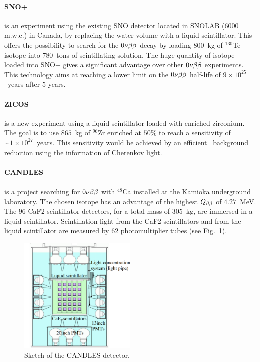 \paragraph{SNO+} is an experiment using the existing SNO detector located in SNOLAB ($6000$ m.w.e.) in Canada, by replacing the water volume with a liquid scintillator.
This offers the possibility to search for the $0\nu\beta\beta$ decay by loading $800$~kg of $^{130}$Te isotope into $780$~tons of scintillating solution.
The huge quantity of isotope loaded into SNO+ gives a significant advantage over other $0\nu\beta\beta$ experiments.
This technology aims at reaching a lower limit on the $0\nu\beta\beta$ half-life of $9 \times 10^{25}$~years after $5$ years.


\paragraph{ZICOS} is a new experiment using a liquid scintillator loaded with enriched zirconium.
The goal is to use $865$~kg of $^{96}$Zr enriched at $50$\% to reach a sensitivity of $\sim 1\times 10^{27}$~years.
This sensitivity would be achieved by an efficient \Tl\ background reduction using the information of Cherenkov light.

\paragraph{CANDLES} is a project searching for $0\nu\beta\beta$ with $^{48}$Ca installed at the Kamioka underground laboratory.
The chosen isotope has an advantage of the highest $Q_{\beta\beta}$ of $4.27$~MeV.
The $96$ CaF2 scintillator detectors, for a total mass of $305$~kg, are immersed in a liquid scintillator.
Scintillation light from the CaF2 scintillators and from the liquid scintillator are measured by $62$ photomultiplier tubes (see Fig.~\ref{fig:CANDLES}).

\begin{figure}
  \centering
  \includegraphics[width=0.5\textwidth]{neutrinophysics/fig_neutrinophysics/CANDLES.pdf}
  \caption{Sketch of the CANDLES detector.
    \label{fig:CANDLES}}
\end{figure}


